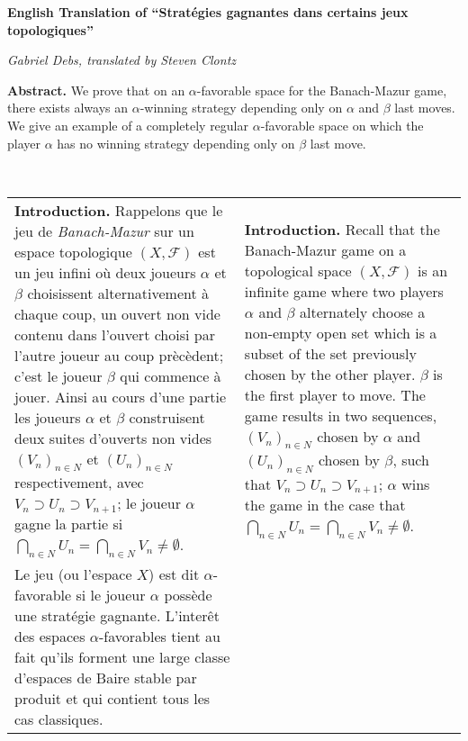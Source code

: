 \documentclass[12pt]{article}
\theoremstyle{plain}
\theoremstyle{definition}
\theoremstyle{remark}
\begin{document}
\centerline{\bf English Translation of ``Strat\'{e}gies gagnantes dans certains jeux topologiques'' }
\centerline{\it Gabriel Debs, translated by Steven Clontz}

\small \textbf{Abstract.} We prove that on an $\alpha$-favorable space for the Banach-Mazur game, there exists always an $\alpha$-winning strategy depending only on $\alpha$ and $\beta$ last moves. We give an example of a completely regular $\alpha$-favorable space on which the player $\alpha$ has no winning strategy depending only on $\beta$ last move.

\

\parindent=0pt

\begin{tabular}{p{2.8in} p{2.8in}}

\textbf{Introduction.} Rappelons que le jeu de \textit{Banach-Mazur} sur un espace topologique $(X,\mathcal{F})$ est un jeu infini o\`{u} deux joueurs $\alpha$ et $\beta$ choisissent alternativement \`{a} chaque coup, un ouvert non vide contenu dans l'ouvert choisi par l'autre joueur au coup pr\`{e}c\`{e}dent; c'est le joueur $\beta$ qui commence \`{a} jouer. Ainsi au cours d'une partie les joueurs $\alpha$ et $\beta$ construisent deux suites d'ouverts non vides $(V_n)_{n\in N}$ et $(U_n)_{n\in N}$ respectivement, avec $V_n \supset U_n \supset V_{n+1}$; le joueur $\alpha$ gagne la partie si $\displaystyle \bigcap_{n\in N} U_n = \bigcap_{n \in N} V_n \not= \emptyset$.

&

\textbf{Introduction.} Recall that the Banach-Mazur game on a topological space $(X,\mathcal{F})$ is an infinite game where two players $\alpha$ and $\beta$ alternately choose a non-empty open set which is a subset of the set previously chosen by the other player. $\beta$ is the first player to move. The game results in two sequences, $(V_n)_{n\in N}$ chosen by $\alpha$ and $(U_n)_{n\in N}$ chosen by $\beta$, such that $V_n \supset U_n \supset V_{n+1}$; $\alpha$ wins the game in the case that $\displaystyle \bigcap_{n\in N} U_n = \bigcap_{n \in N} V_n \not= \emptyset$.

\\

Le jeu (ou l'espace $X$) est dit $\alpha$-favorable si le joueur $\alpha$ poss\`ede une strat\'egie gagnante. L'inter\^et des espaces $\alpha$-favorables tient au fait qu'ils forment une large classe d'espaces de Baire stable par produit et qui contient tous les cas classiques.

&


\end{tabular}
\end{document}
